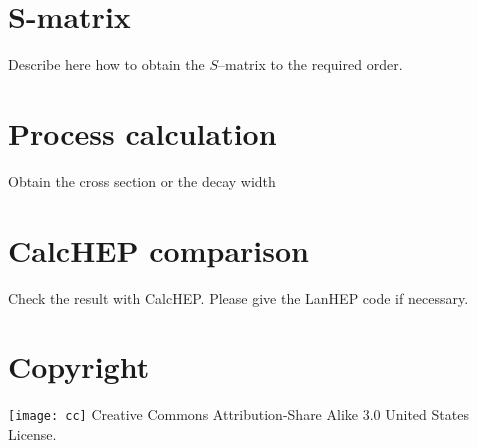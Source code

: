 \section{S-matrix}
Describe here how to obtain the $S$--matrix to the required order.

\section{Process calculation}
Obtain the cross section or the decay width

\section{CalcHEP comparison}
Check the result with CalcHEP. Please give the LanHEP code if necessary.


\section{Copyright}
\texttt{[image: cc]} Creative Commons Attribution-Share Alike 3.0 United States License.





